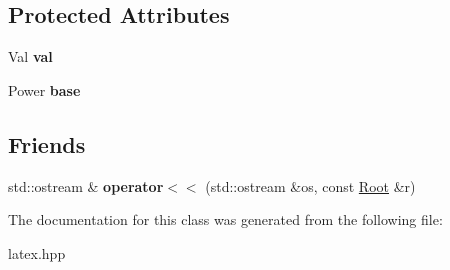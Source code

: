 \subsection*{Protected Attributes}
\begin{DoxyCompactItemize}
\item 
\hypertarget{classlatex_1_1math_1_1Root_ae90dc3215a792f70e39fa7c9b5308197}{Val {\bfseries val}}\label{classlatex_1_1math_1_1Root_ae90dc3215a792f70e39fa7c9b5308197}

\item 
\hypertarget{classlatex_1_1math_1_1Root_a61e42eb68a4383059f6510d95b7d8163}{Power {\bfseries base}}\label{classlatex_1_1math_1_1Root_a61e42eb68a4383059f6510d95b7d8163}

\end{DoxyCompactItemize}
\subsection*{Friends}
\begin{DoxyCompactItemize}
\item 
\hypertarget{classlatex_1_1math_1_1Root_a74f0bf7df3ef1d4ca32576d6f0a2152b}{std\-::ostream \& {\bfseries operator$<$$<$} (std\-::ostream \&os, const \hyperlink{classlatex_1_1math_1_1Root}{Root} \&r)}\label{classlatex_1_1math_1_1Root_a74f0bf7df3ef1d4ca32576d6f0a2152b}

\end{DoxyCompactItemize}


The documentation for this class was generated from the following file\-:\begin{DoxyCompactItemize}
\item 
latex.\-hpp\end{DoxyCompactItemize}
